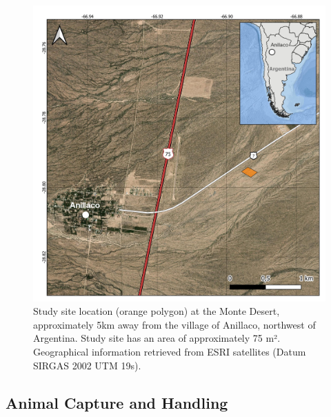 \documentclass[msc,numbers,hidelinks]{coppe}
\begin{document}
  \begin{figure}

  {\centering \includegraphics[width=1\linewidth]{../04_figures/map/tuco_map} 

  }

  \caption{Study site location (orange polygon) at the Monte Desert, approximately 5km away from the village of Anillaco, northwest of Argentina. Study site has an area of approximately 75 m². Geographical information retrieved from ESRI satellites (Datum SIRGAS 2002 UTM 19s).}\label{fig:methods-map}
  \end{figure}
  \hypertarget{animal-capture-and-handling}{%
  \subsection{Animal Capture and Handling}\label{animal-capture-and-handling}}
\end{document}
